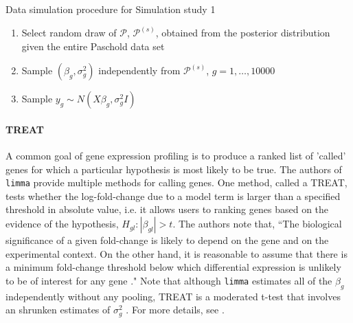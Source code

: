 \begin{itemize}
\begin{table}
\caption{Data simulation procedure for Simulation study 1}
\begin{enumerate}
\item Select random draw of $\mathcal{P}$, $\mathcal{P}^{(s)}$, obtained from the posterior distribution given the entire Paschold data set
\item Sample $(\beta_g,\sigma^2_g)$ independently from $\mathcal{P}^{(s)}$, $g=1,\ldots,10000$
\item Sample $y_{g} \sim N(X\beta_g,\sigma^2_g I)$
\end{enumerate}
\end{table}

\paragraph{TREAT}
A common goal of gene expression profiling is to produce a ranked list of 'called' genes for which a particular hypothesis is most likely to be true. The authors of \texttt{limma} provide multiple methods for calling genes. One method, called a TREAT, tests whether the log-fold-change due to a model term is larger than a specified threshold in absolute value, i.e. it allows users to ranking genes based on the evidence of the hypothesis, $H_{gl}:|\beta_{gl}|>t$. The authors note that, ``The biological significance of a given fold-change is likely to depend on the gene and on the experimental context. On the other hand, it is reasonable to assume that there is a minimum fold-change threshold below which differential expression is unlikely to be of interest for any gene \citep[pp. 765-755]{treat}." Note that although \texttt{limma} estimates all of the $\beta_g$ independently without any pooling, TREAT is a moderated t-test that involves an shrunken estimates of $\sigma^2_g$ \citep{treat}. For more details, see \citet{treat}.


\end{itemize}
